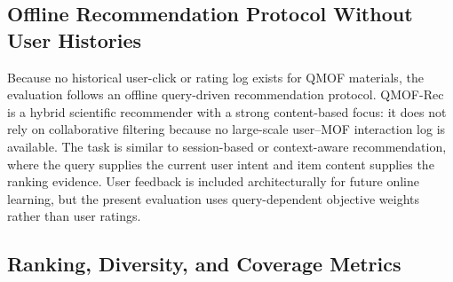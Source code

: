 \documentclass[12pt,a4paper]{article}
\begin{document}
\subsection{Offline Recommendation Protocol Without User Histories}

Because no historical user-click or rating log exists for QMOF materials, the evaluation follows an offline query-driven recommendation protocol. QMOF-Rec is a hybrid scientific recommender with a strong content-based focus: it does not rely on collaborative filtering because no large-scale user--MOF interaction log is available. The task is similar to session-based or context-aware recommendation, where the query supplies the current user intent and item content supplies the ranking evidence. User feedback is included architecturally for future online learning, but the present evaluation uses query-dependent objective weights rather than user ratings.

\subsection{Ranking, Diversity, and Coverage Metrics}
\label{sec:metrics_detail}
\end{document}
